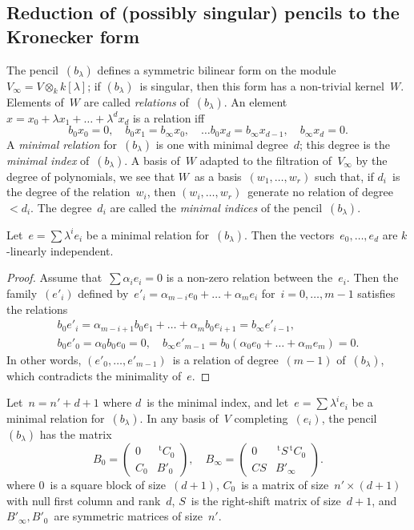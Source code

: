 \documentclass{lms}%
\def\transpose{\,{}^{\mathrm{t}\!}}
\def\mat#1{\begin{pmatrix}#1\end{pmatrix}}
\begin{document}
\subsection{Reduction of (possibly singular) pencils to the Kronecker form} %
The pencil~$(b_{λ})$ defines a symmetric bilinear form on the
module~$V_{∞} = V ⊗_{k} k[λ]$; if $(b_{λ})$~is singular, then this form
has a non-trivial kernel~$W$. Elements of~$W$ are called \emph{relations}
of~$(b_{λ})$. An element~$x = x_0 + λ x_1 + … + λ^d x_d$ is a
relation iff
\begin{equation}\label{eq:relation}
b_0 x_0 = 0, \quad
b_0 x_1 = b_{∞} x_0, \quad …
b_0 x_d = b_{∞} x_{d-1}, \quad
b_{∞} x_{d} = 0.
\end{equation}
A \emph{minimal relation} for~$(b_{λ})$ is one with minimal degree~$d$;
this degree is the \emph{minimal index} of~$(b_{λ})$. A basis
of~$W$ adapted to the filtration of~$V_{∞}$ by the degree of polynomials,
we see that $W$~as a basis~$(w_1,…,w_r)$ such that, if $d_i$~is the
degree of the relation~$w_i$, then $(w_i,…,w_r)$~generate no relation of
degree~$< d_i$. The degree~$d_i$ are called the \emph{minimal indices} of
the pencil~$(b_{λ})$.
\begin{prop}\label{prop:minimal-indep}%
Let~$e = ∑ λ^i e_i$ be a minimal relation for~$(b_{λ})$. Then the
vectors~$e_0,…,e_{d}$ are $k$-linearly independent.
\end{prop}

\begin{proof}
Assume that~$∑ α_i e_i = 0$ is a non-zero relation between the~$e_i$.
Then the family~$(e'_i)$ defined by~$e'_i = α_{m-i} e_0 + … + α_m
e_{i}$ for~$i = 0, …, m-1$ satisfies the relations
\begin{equation}\label{eq:relation-e'}
\begin{split}
b_0 e'_{i} = α_{m-i+1} b_0 e_1 + … + α_{m} b_0 e_{i+1} = b_{∞} e'_{i-1},
\\
b_0 e'_0 = α_0 b_0 e_0 = 0,
\quad b_{∞} e'_{m-1} = b_0(α_0 e_0 + … + α_m e_m) = 0.
\end{split}\end{equation}
In other words, $(e'_0,…, e'_{m-1})$~is a relation of degree~$(m-1)$
of~$(b_{λ})$, which contradicts the minimality of~$e$.
\end{proof}%
\begin{prop}\label{prop:minimal-matrix}%
Let~$n = n'+d+1$ where $d$~is the minimal index, and let~$e = ∑ λ^i
e_i$ be a minimal relation for~$(b_{λ})$. In any basis of~$V$
completing~$(e_i)$, the pencil~$(b_{λ})$ has the matrix
\begin{equation}\label{eq:minimal-matrix}
B_{0} = \mat{0 & \transpose{C_0}\\ C_0 & B'_{0}}, \quad
B_{∞} = \mat{0 & \transpose{S} \transpose{C_0}\\ CS & B'_{∞}}.
\end{equation}
where $0$~is a square block of size~$(d+1)$, $C_0$~is a matrix of size~$n'
× (d+1)$ with null first column and rank~$d$, $S$~is the right-shift
matrix of size~$d+1$, and $B'_{∞}, B'_0$~are symmetric matrices of
size~$n'$.
\end{prop}
\end{document}

